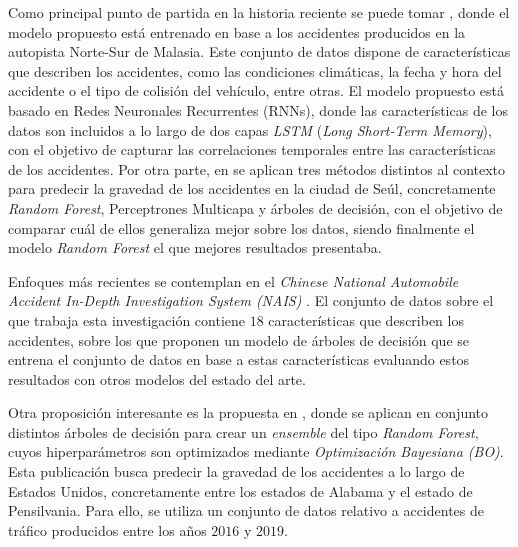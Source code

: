 \documentclass{uathesis-es}
\begin{document}
	Como principal punto de partida en la historia reciente se puede tomar \cite{app7060476}, donde el modelo propuesto está entrenado en base a los accidentes producidos en la autopista Norte-Sur de Malasia. Este conjunto de datos dispone de características que describen los accidentes, como las condiciones climáticas, la fecha y hora del accidente o el tipo de colisión del vehículo, entre otras. El modelo propuesto está basado en Redes Neuronales Recurrentes (RNNs), donde las características de los datos son incluidos a lo largo de dos capas \textit{LSTM} (\textit{Long Short-Term Memory}), con el objetivo de capturar las correlaciones temporales entre las características de los accidentes. Por otra parte, en \cite{app10010129} se aplican tres métodos distintos al contexto para predecir la gravedad de los accidentes en la ciudad de Seúl, concretamente \textit{Random Forest}, Perceptrones Multicapa y árboles de decisión, con el objetivo de comparar cuál de ellos generaliza mejor sobre los datos, siendo finalmente el modelo \textit{Random Forest} el que mejores resultados presentaba.
	
	Enfoques más recientes se contemplan en el \textit{Chinese National Automobile Accident In-Depth Investigation System (NAIS)} \cite{Yang2023}. El conjunto de datos sobre el que trabaja esta investigación contiene $18$ características que describen los accidentes, sobre los que proponen un modelo de árboles de decisión que se entrena el conjunto de datos en base a estas características evaluando estos resultados con otros modelos del estado del arte.
	
	Otra proposición interesante es la propuesta en \cite{su14031729}, donde se aplican en conjunto distintos árboles de decisión para crear un \textit{ensemble} del tipo \textit{Random Forest}, cuyos hiperparámetros son optimizados mediante \textit{Optimización Bayesiana (BO)}. Esta publicación busca predecir la gravedad de los accidentes a lo largo de Estados Unidos, concretamente entre los estados de Alabama y el estado de Pensilvania. Para ello, se utiliza un conjunto de datos relativo a accidentes de tráfico producidos entre los años $2016$ y $2019$.
	
\end{document}
